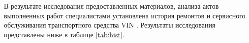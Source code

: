 В результате исследования предоставленных материалов, анализа актов выполненных работ  специалистами установлена  история ремонтов и сервисного обслуживания  транспортного средства VIN \vin. Результаты исследования представлены ниже в таблице \ref{tab:hist}.
%		
%		
%		


